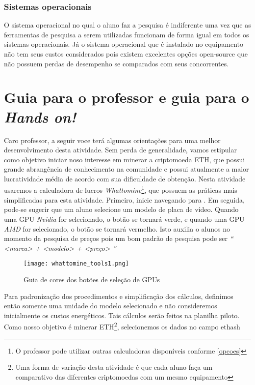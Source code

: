 \subsubsection{Sistemas operacionais} 
O sistema operacional no qual o aluno faz a pesquisa é indiferente uma vez que as ferramentas de pesquisa a serem utilizadas funcionam de forma igual em todos os sistemas operacionais. Já o sistema operacional que é instalado no equipamento não tem seus custos considerados pois existem excelentes opções open-source que não possuem perdas de desempenho se comparados com seus concorrentes. 

\section{Guia para o professor e guia para o \textit{Hands on!}} \label{profguide}

Caro professor, a seguir voce terá algumas orientações para uma melhor desenvolvimento desta atividade. Sem perda de generalidade, vamos estipular como objetivo iniciar noso interesse em minerar a criptomoeda ETH, que possui grande abrangência de conhecimento na comunidade e possui atualmente a maior lucratividade média de acordo com sua dificuldade de obtenção. Nesta atividade usaremos a calculadora de lucros \textit{Whattomine}\footnote{O professor pode utilizar outras calculadoras disponíveis conforme \ref{opcoes}}, que possuem as práticas mais simplificadas para esta atividade.  Primeiro, inicie navegando para \cite{WTM} . Em seguida, pode-se sugerir que um aluno selecione um modelo de placa de vídeo. Quando uma GPU \textit{Nvidia} for selecionado, o botão se tornará verde, e quando uma GPU \textit{AMD}  for selecionado, o botão se tornará vermelho. Isto auxilia o alunos no momento da pesquisa de preços pois um bom padrão de pesquisa pode ser \textit{`` <marca> + <modelo> + <preço> ''}
 
\begin{figure}[H]
	\centering
	\caption{Guia de cores dos botões de seleção de GPUs}
	\texttt{[image: whattomine\_tools1.png]}\\
	
\end{figure}

Para padronização dos procedimentos e simplificação dos cálculos, definimos então somente uma unidade do modelo selecionado e não consideremos inicialmente os custos energéticos. Tais cálculos serão feitos na planilha piloto. Como nosso objetivo é minerar ETH\footnote{Uma forma de variação desta atividade é que cada aluno faça um comparativo das diferentes criptomoedas com um mesmo equipamento}, selecionemos os dados no campo ethash 

